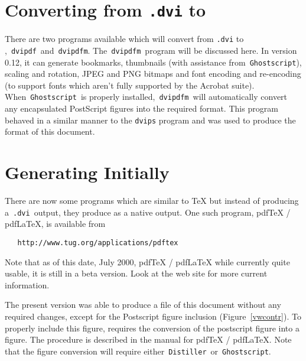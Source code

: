 \section{Converting from {\tt *.dvi} to \pdf}
There are two programs available which will convert from {\tt *.dvi} to \pdf,\ {\tt dvipdf}\ and\
{\tt dvipdfm}.  The\ {\tt dvipdfm}\ program  will be discussed here.  In version 0.12, it can generate
bookmarks, thumbnails (with assistance from\ {\tt Ghostscript}), scaling and rotation, JPEG and
PNG bitmaps and font encoding and re-encoding (to support fonts which aren't fully supported by
the Acrobat suite).  When\ {\tt Ghostscript}\ is properly installed,\ {\tt dvipdfm}\ will automatically
convert any encapsulated PostScript figures into the required \pdf{} format.  This program behaved in a
similar manner to the {\tt dvips} program and was used to produce the \pdf{} format of this document.



\section{Generating \pdf{} Initially}
There are now some programs which are similar to \TeX{} but instead of producing a\ {\tt .dvi}\ output,
they produce \pdf as a native output.  One such program, {\sc pdf}\TeX{} / {\sc pdf}\LaTeX{},
is available from

{\tt \verb|   http://www.tug.org/applications/pdftex|}

Note that as of this date, July 2000, {\sc pdf}\TeX{} / {\sc pdf}\LaTeX{} while currently quite usable, it
is still in a beta version.  Look at the web site for more current information.

The present version was able to produce a \pdf{} file of this document without any required
changes, except for the Postscript figure inclusion  (Figure~\ref{vwcontr}).  To properly include
this figure, requires the conversion of the postscript figure into a \pdf{} figure.  The procedure
is described in the manual for {\sc pdf}\TeX{} / {\sc pdf}\LaTeX{}.  Note that the figure conversion will
require either\ {\tt Distiller}\ or\ {\tt Ghostscript}.
